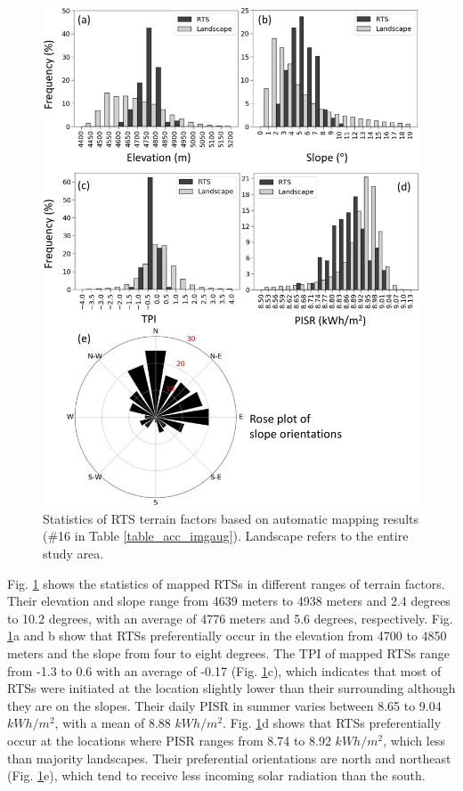 \documentclass[preprint,12pt,authoryear]{elsarticle}
\begin{document}
\begin{figure}
	\centering
	\includegraphics[width=13cm]{figures/terrain_var_fig_mapped_trim.jpg}
	\caption{Statistics of RTS terrain factors based on automatic mapping results  (\#16 in Table \ref{table_acc_imgaug}). Landscape refers to the entire study area.}
	\label{fig_terrain_factors}
\end{figure}

Fig. \ref{fig_terrain_factors} shows the statistics of mapped RTSs in different ranges of terrain factors. Their elevation and slope range from 4639 meters to 4938 meters and 2.4 degrees to 10.2 degrees, with an average of 4776 meters and 5.6 degrees, respectively. Fig. \ref{fig_terrain_factors}a and b show that RTSs preferentially occur in the elevation from 4700 to 4850 meters and the slope from four to eight degrees. The TPI of mapped RTSs range from -1.3 to 0.6 with an average of -0.17 (Fig. \ref{fig_terrain_factors}c), which indicates that most of RTSs were initiated at the location slightly lower than their surrounding although they are on the slopes. Their daily PISR in summer varies between 8.65 to 9.04 $kWh/m^2$, with a mean of 8.88 $kWh/m^2$. Fig. \ref{fig_terrain_factors}d shows that RTSs preferentially occur at the locations where PISR ranges from 8.74 to 8.92 $kWh/m^2$, which less than majority landscapes. Their preferential orientations are north and northeast (Fig. \ref{fig_terrain_factors}e), which tend to receive less incoming solar radiation than the south. 
\end{document}
